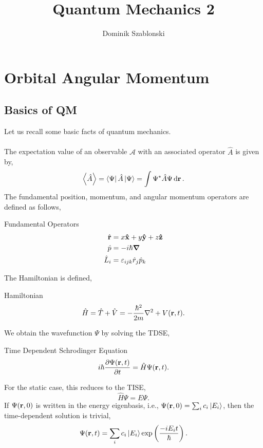 \documentclass{book}
\title{Quantum Mechanics 2}
\author{Dominik Szablonski}
\begin{document}
\maketitle

\tableofcontents

\chapter{Orbital Angular Momentum}
\section{Basics of QM}
Let us recall some basic facts of quantum mechanics.
\\\\
The expectation value of an observable $\mathcal{A}$ with an associated operator $\hat{A}$ is given by,
\begin{equation}
	\left<\hat{A}\right> = \bra{\Psi}\hat{A}\ket{\Psi} = \int\Psi^*\hat{A}\Psi\dd{\vb{r}}.
\end{equation}
The fundamental position, momentum, and angular momentum operators are defined as follows,
\begin{Definitions}{Fundamental Operators}{}
	\begin{align}
		\hat{\vb{r}} &= x\vu{x} + y\vu{y} + z\vu{z} \\
		\hat{p} &= -i\hbar \grad \\
		\hat{L}_i &= \varepsilon_{ijk}\hat{r}_j\hat{p}_k
	\end{align}
\end{Definitions}
The Hamiltonian is defined,
\begin{Definitions}{Hamiltonian}{}
	\begin{equation}
		\hat{H} = \hat{T} + \hat{V} = -\frac{\hbar^2}{2m}\laplacian + V(\vb{r}, t).
	\end{equation}
\end{Definitions}
We obtain the wavefunction $\Psi$ by solving the TDSE,
\begin{Definitions}{Time Dependent Schrodinger Equation}{}
	\begin{equation}
		i\hbar\pdv{\Psi(\vb{r},t)}{t} = \hat{H}\Psi(\vb{r},t).
	\end{equation}
\end{Definitions}
For the static case, this reduces to the TISE,
\begin{equation}
	\hat{H}\Psi = E \Psi. \label{eq:TISE}
\end{equation}
If $\Psi(\vb{r},0)$ is written in the energy eigenbasis, i.e., $\Psi(\vb{r},0) = \sum_i c_i\ket{E_i}$, then the time-dependent solution is trivial,
\begin{equation}
	\Psi(\vb{r},t) = \sum_i c_i\ket{E_i} \exp\left(\frac{-iE_it}{\hbar}\right).
\end{equation}
\end{document}
